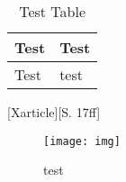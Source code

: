 \begin{table}[H]
    \caption{Test Table}
    \begin{tabular}{| l | l |}
        Test & Test\\
        \hline Test & test
    \end{tabular}
\end{table}

[Xarticle][S. 17ff]

\begin{figure}[H]
    \centering
    \caption{test}
    \texttt{[image: img]}
    \label{fig:anlagentest}
\end{figure}
